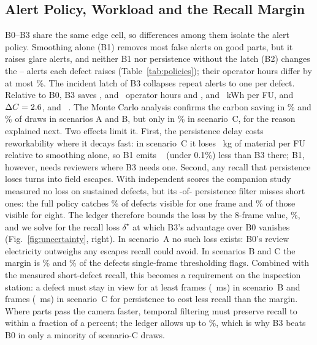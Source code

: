 \subsection{Alert Policy, Workload and the Recall Margin}
B0--B3 share the same edge cell, so differences among them isolate the alert policy. Smoothing alone (B1) removes most false alerts on good parts, but it raises glare alerts, and neither B1 nor persistence without the latch (B2) changes the \AlertsPerDefectMin--\AlertsPerDefectMax{} alerts each defect raises (Table~\ref{tab:policies}); their operator hours differ by at most \BOneBTwoHoursDiffMax\%. The incident latch of B3 collapses repeat alerts to one per defect. Relative to B0, B3 saves \PrecDeltaHvsBZero, \MetalDeltaHvsBZero{} and \HiValDeltaHvsBZero~operator hours and \PrecDeltaEvsBZero, \MetalDeltaEvsBZero{} and \HiValDeltaEvsBZero~kWh per FU, and $\Delta C=2.6$, \MetalDeltaCvsBZero{} and \HiValDeltaCvsBZero~\kgce{}. The Monte Carlo analysis confirms the carbon saving in \PrecMcProbBZero\% and \MetalMcProbBZero\% of draws in scenarios A and B, but only in \HiValMcProbBZero\% in scenario~C, for the reason explained next. Two effects limit it. First, the persistence delay costs reworkability where it decays fast: in scenario~C it loses \HiValDelayMaterialCost~kg of material per FU relative to smoothing alone, so B1 emits \HiValBOneCarbonEdge~\kgce{} (under 0.1\%) less than B3 there; B1, however, needs \HiValReviewersBOne{} reviewers where B3 needs one. Second, any recall that persistence loses turns into field escapes. With independent scores the companion study measured no loss on sustained defects, but its \PaperAShortK-of-\PaperAShortN{} persistence filter misses short ones: the full policy catches \PaperAShortRecallOne\% of defects visible for one frame and \PaperAShortRecallEight\% of those visible for eight. The ledger therefore bounds the loss by the 8-frame value, \PersistLossMax\%, and we solve for the recall loss $\delta^\star$ at which B3's advantage over B0 vanishes (Fig.~\ref{fig:uncertainty}, right). In scenario~A no such loss exists: B0's review electricity outweighs any escapes recall could avoid. In scenarios B and C the margin is \MetalRecallLossStar\% and \HiValRecallLossStar\% of the defects single-frame thresholding flags. Combined with the measured short-defect recall, this becomes a requirement on the inspection station: a defect must stay in view for at least \MetalVisibleFrames{} frames (\MetalVisibleMs~ms) in scenario~B and \HiValVisibleFrames{} frames (\HiValVisibleMs~ms) in scenario~C for persistence to cost less recall than the margin. Where parts pass the camera faster, temporal filtering must preserve recall to within a fraction of a percent; the ledger allows up to \PersistLossMax\%, which is why B3 beats B0 in only a minority of scenario-C draws.

